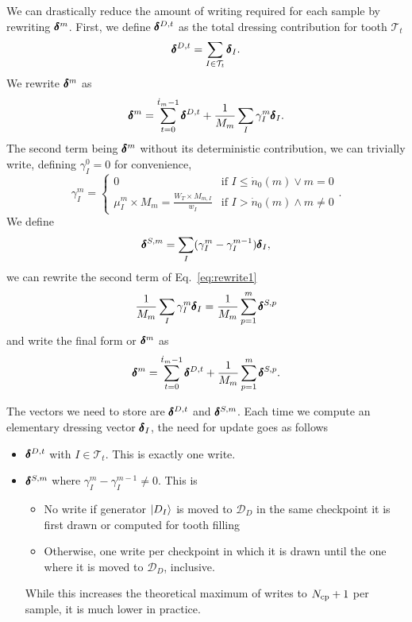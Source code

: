 \documentclass[./thesis.tex]{subfiles}
\begin{document}
We can drastically reduce the amount of writing required for each sample by rewriting $\pmb \delta^m$.
First, we define $\pmb \delta^{D,t}$ as the total dressing contribution for tooth $\mathcal{T}_t$
\begin{equation}
\pmb \delta^{D,t} = \sum_{I \in \mathcal{T}_t} \pmb \delta_I.
\end{equation}
We rewrite $\pmb \delta^m$ as
\begin{equation}
\label{eq:rewrite1}
\pmb \delta^{m} = \sum_{t=0}^{\dot t_m - 1} \pmb \delta^{D,t}+ \frac{1}{M_m} \sum_{I} \gamma^m_{I} \pmb \delta_I.
\end{equation}
The second term being $\pmb \delta^m$ without its deterministic contribution, we can trivially write, defining $\gamma^ 0_I=0$ for convenience,
\begin{equation}
\gamma^m_I = 
\begin{cases}
0 & \text{if } I \leq \dot n_0(m) \vee m=0 \\
\mu^m_I \times M_m = \frac{W_T \times M_{m,I}}{w_I} & \text{if } I > \dot n_0(m) \wedge m \neq 0
\end{cases}.
\end{equation}
We define
\begin{align}
\pmb \delta^{S,m} = \sum_I (\gamma^m_I - \gamma^{m-1}_I) \pmb \delta_I,
\end{align}
we can rewrite the second term of Eq.~\eqref{eq:rewrite1}
\begin{equation}
\frac{1}{M_m}\sum_{I} \gamma^m_{I} \pmb \delta_I = \frac{1}{M_m} \sum_{p=1}^m \pmb \delta^{S,p}
\end{equation}
and write the final form or $\pmb \delta^m$ as
\begin{equation}
\pmb \delta^m=\sum_{t=0}^{\dot t_{m}-1} \pmb \delta^{D,t} + \frac{1}{M_m} \sum_{p=1}^m \pmb \delta^{S,p}.
\end{equation}

The vectors we need to store are $\pmb \delta^{D,t}$ and $\pmb \delta^{S,m}$. Each time we compute an elementary dressing vector $\pmb \delta_I$, the need for update goes as follows
\begin{itemize}
\item
$\pmb \delta^{D,t}$ with $I \in \mathcal{T}_t$. This is exactly one write.
\item
$\pmb \delta^{S,m}$ where $\gamma^m_I - \gamma^{m-1}_I \neq 0$. This is
 \begin{itemize}
 \item No write if generator $\ket{D_I}$ is moved to $\mathcal{D}_D$ in the same checkpoint it is first drawn or computed for tooth filling
 \item Otherwise, one write per checkpoint in which it is drawn until the one where it is moved to $\mathcal{D}_D$, inclusive.
 \end{itemize}
 While this increases the theoretical maximum of writes to ${N_\text{cp}}+1$ per sample, it is much lower in practice.
\end{itemize}
\end{document}
